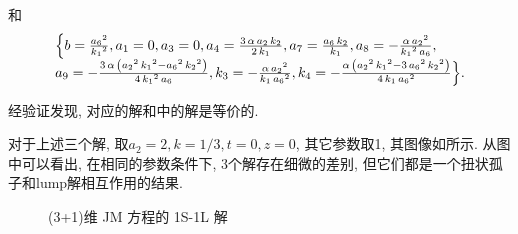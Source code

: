 和
\begin{equation}
\renewcommand{\arraystretch}{1.2}
\begin{array}{l} 
\dbrace{ 
b=\frac{{{{a}_{6}}}^{2}}{{{{k}_{1}}}^{2}},
{{a}_{1}}=0,
{{a}_{3}}=0,
{{a}_{4}}=\frac{3\,\alpha\,{{a}_{2}}\,{{k}_{2}}}{2\,{{k}_{1}}},
{{a}_{7}}=\frac{{{a}_{6}}\,{{k}_{2}}}{{{k}_{1}}},
{{a}_{8}}=-\frac{\alpha\,{{{a}_{2}}}^{2}}{{{{k}_{1}}}^{2}\,{{a}_{6}}},\\
{{a}_{9}}=-\frac{3\,\alpha\,\left( {{{a}_{2}}}^{2}\,{{{k}_{1}}}^{2}-{{{a}_{6}}}^{2}\,{{{k}_{2}}}^{2}\right) }{4\,{{{k}_{1}}}^{2}\,{{a}_{6}}},
{{k}_{3}}=-\frac{\alpha\,{{{a}_{2}}}^{2}}{{{k}_{1}}\,{{{a}_{6}}}^{2}},
{{k}_{4}}=-\frac{\alpha\,\left( {{{a}_{2}}}^{2}\,{{{k}_{1}}}^{2}-3\,{{{a}_{6}}}^{2}\,{{{k}_{2}}}^{2}\right) }{4\,{{k}_{1}}\,{{{a}_{6}}}^{2}}
}. 
\end{array}
\label{1S1L-3}
\end{equation}

经验证发现, 对应的解和中的解是等价的. 

对于上述三个解, 取$a_2=2,k=1/3,t=0,z=0$, 其它参数取1, 其图像如所示. 从图中可以看出, 在相同的参数条件下, 3个解存在细微的差别, 但它们都是一个扭状孤子和lump解相互作用的结果. 

\begin{figure}[H]
\centering
{}
\caption{(3+1)维 JM 方程的 1S-1L 解} \label{fig-1S1L}
\end{figure}

